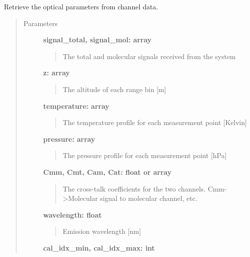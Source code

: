 \documentclass[letterpaper,10pt,english]{sphinxmanual}
\begin{document}

\begin{fulllineitems}
\label{hsrl_retrieval:hsrl_retrieval.retrieve_channel}
Retrieve the optical parameters from channel data.
\begin{quote}\begin{description}
\item[{Parameters}] \leavevmode
\textbf{signal\_total, signal\_mol: array}
\begin{quote}

The total and molecular signals received from the system
\end{quote}

\textbf{z: array}
\begin{quote}

The altitude of each range bin {[}m{]}
\end{quote}

\textbf{temperature: array}
\begin{quote}

The temperature profile for each measurement point {[}Kelvin{]}
\end{quote}

\textbf{pressure: array}
\begin{quote}

The pressure profile for each measurement point {[}hPa{]}
\end{quote}

\textbf{Cmm, Cmt, Cam, Cat: float or array}
\begin{quote}

The cross-talk coefficients for the two channels. Cmm-\textgreater{}Molecular signal 
to molecular channel, etc.
\end{quote}

\textbf{wavelength: float}
\begin{quote}

Emission wavelength {[}nm{]}
\end{quote}

\textbf{cal\_idx\_min, cal\_idx\_max: int}
\begin{quote}


\end{quote}
\end{description}
\end{quote}
\end{fulllineitems}
\end{document}
